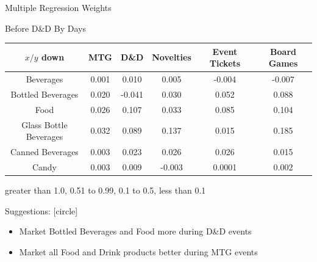 \documentclass[compress,blue]{beamer}
\begin{document}
\begin{frame}{Multiple Regression Weights}
\begin{center}
\begin{center}
\end{center}
\tiny
\begin{center}Before D\&D By Days\end{center}
\tiny
\begin{tabular}{ c || c | c | c | c | c |}
 $x/y$ down & MTG & D\&D  & Novelties  & Event Tickets  & Board
 Games\\ 
 \hline 
 \hline
 Beverages & {\color{blue}0.001} & {\color{blue}0.010} &
 {\color{blue}0.005} & {\color{blue}-0.004} & {\color{blue}-0.007} \\
 \hline
 Bottled Beverages & {\color{blue}0.020} & {\color{blue}-0.041} &
 {\color{blue}0.030} & {\color{blue}0.052} & {\color{blue}0.088} \\
 \hline
 Food & {\color{blue}0.026} & {\color{orange}0.107} &
 {\color{blue}0.033} & {\color{blue}0.085} & {\color{orange}0.104} \\
 \hline
 Glass Bottle Beverages & {\color{blue}0.032} & {\color{blue}0.089} &
 {\color{orange}0.137} & {\color{blue}0.015} & {\color{orange}0.185} \\
 \hline
 Canned Beverages & {\color{blue}0.003} & {\color{blue}0.023} &
 {\color{blue}0.026} & {\color{blue}0.026} & {\color{blue}0.015} \\
 \hline
 Candy & {\color{blue}0.003} & {\color{blue}0.009} &
 {\color{blue}-0.003} & {\color{blue}0.0001} & {\color{blue}0.002} \\
 \hline 
\end{tabular}
\begin{center}
\begin{tablenotes}
{{\color{green} greater than 1.0},
 {\color{magenta}0.51 to 0.99}, {\color{orange}0.1 to 0.5}, 
 {\color{blue} less than 0.1}}
\end{tablenotes}
\end{center}
\end{center}

\newline
\small
Suggestions: 
[circle]
\begin{itemize}
	\item Market Bottled Beverages and Food more during D\&D events
	\item Market all Food and Drink products better during MTG events
\end{itemize}
\end{frame}
\end{document}
